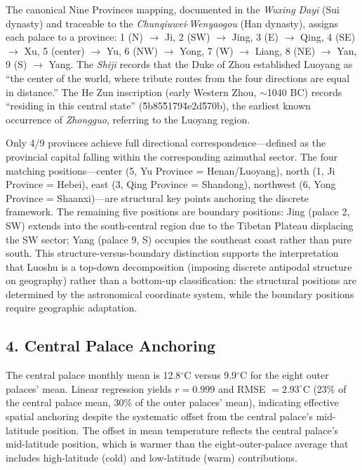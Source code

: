 \documentclass[10pt]{article}
\begin{document}
The canonical Nine Provinces mapping, documented in the \textit{Wuxing Dayi} (Sui dynasty) and traceable to the \textit{Chunqiuwei$\cdot$Wenyaogou} (Han dynasty), assigns each palace to a province: 1 (N) $\to$ Ji, 2 (SW) $\to$ Jing, 3 (E) $\to$ Qing, 4 (SE) $\to$ Xu, 5 (center) $\to$ Yu, 6 (NW) $\to$ Yong, 7 (W) $\to$ Liang, 8 (NE) $\to$ Yan, 9 (S) $\to$ Yang. The \textit{Shiji} records that the Duke of Zhou established Luoyang as ``the center of the world, where tribute routes from the four directions are equal in distance.'' The He Zun inscription (early Western Zhou, $\sim$1040 BC) records ``residing in this central state'' (\u5b85\u5179\u4e2d\u570b), the earliest known occurrence of \textit{Zhongguo}, referring to the Luoyang region.

Only 4/9 provinces achieve full directional correspondence---defined as the provincial capital falling within the corresponding azimuthal sector. The four matching positions---center (5, Yu Province = Henan/Luoyang), north (1, Ji Province = Hebei), east (3, Qing Province = Shandong), northwest (6, Yong Province = Shaanxi)---are structural key points anchoring the discrete framework. The remaining five positions are boundary positions: Jing (palace 2, SW) extends into the south-central region due to the Tibetan Plateau displacing the SW sector; Yang (palace 9, S) occupies the southeast coast rather than pure south. This structure-versus-boundary distinction supports the interpretation that Luoshu is a top-down decomposition (imposing discrete antipodal structure on geography) rather than a bottom-up classification: the structural positions are determined by the astronomical coordinate system, while the boundary positions require geographic adaptation.

\subsection*{4. Central Palace Anchoring}

The central palace monthly mean is 12.8$^\circ$C versus 9.9$^\circ$C for the eight outer palaces' mean. Linear regression yields $r = 0.999$ and RMSE $= 2.93^\circ$C (23\% of the central palace mean, 30\% of the outer palaces' mean), indicating effective spatial anchoring despite the systematic offset from the central palace's mid-latitude position. The offset in mean temperature reflects the central palace's mid-latitude position, which is warmer than the eight-outer-palace average that includes high-latitude (cold) and low-latitude (warm) contributions.
\end{document}
